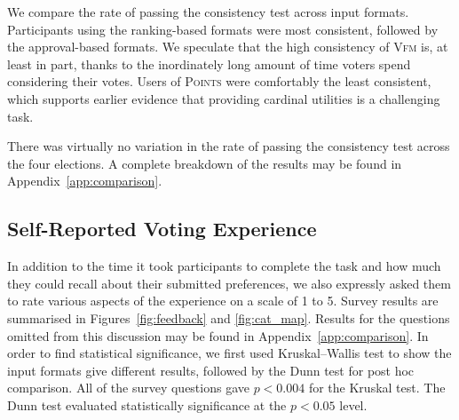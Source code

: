 \documentclass{comsoc2023}
\newcommand{\points}{\textsc{Points}}
\newcommand{\vfm}{\textsc{Vfm}}
\begin{document}
We  compare the rate of passing the consistency test across input formats. 
Participants using the ranking-based formats were most consistent, followed by the approval-based formats.  We speculate that the high consistency of \vfm{} is, at least in part, thanks to the inordinately long amount of time voters spend considering their votes. Users of \points{} were comfortably the least consistent, which  supports earlier evidence that providing cardinal utilities is a challenging task.

There was virtually no variation in the rate of passing the consistency test across the four elections. A complete breakdown of the results may be found in Appendix~\ref{app:comparison}. 



\subsection{Self-Reported Voting Experience}
In addition to the time it took participants to complete the task and how much they could recall about their submitted preferences, we also expressly asked them to rate various aspects of the experience on a scale of 1 to 5. %
Survey results are summarised in  Figures~\ref{fig:feedback} and \ref{fig:cat_map}.
Results for the questions omitted from this discussion may be found in Appendix~\ref{app:comparison}.
In order to find statistical significance, we first used Kruskal–Wallis test to show the input formats give different results, followed by the Dunn test for post hoc comparison.
All of the survey questions   gave $p < 0.004$  for the Kruskal test. The Dunn test evaluated statistically significance   at the $p < 0.05$ level.
\end{document}
